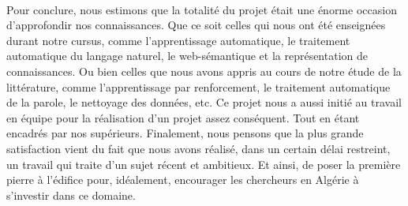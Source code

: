\paragraph{}
Pour conclure, nous estimons que la totalité du projet était une énorme occasion d'approfondir nos connaissances. Que ce soit celles qui nous ont été enseignées durant notre cursus, comme l'apprentissage automatique, le traitement automatique du langage naturel, le web-sémantique et la représentation de connaissances. Ou bien celles que nous avons appris au cours de notre étude de la littérature, comme l'apprentissage par renforcement, le traitement automatique de la parole, le nettoyage des données, etc. Ce projet nous a aussi initié au travail en équipe pour la réalisation d'un projet assez conséquent. Tout en étant encadrés par nos supérieurs.
Finalement, nous pensons que la plus grande satisfaction vient du fait que nous avons réalisé, dans un certain délai restreint, un travail qui traite d'un sujet récent et ambitieux. Et ainsi, de poser la première pierre à l'édifice pour, idéalement, encourager les chercheurs en Algérie à s'investir dans ce domaine. 

